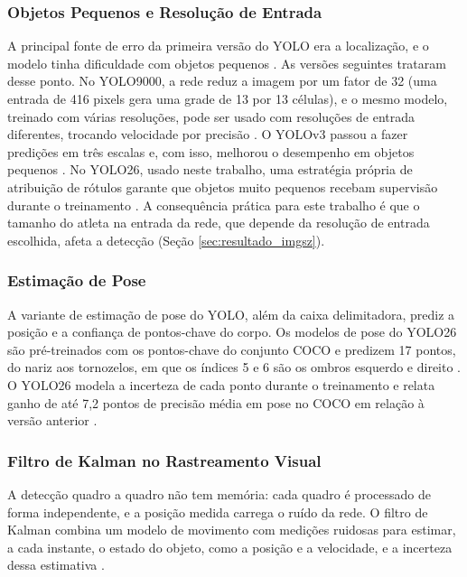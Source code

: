 \documentclass[
    12pt,               %
    openright,          %
    twoside,            %
    a4paper,            %
    chapter=TITLE,      %
    english,            %
    brazil              %
    ]{abntex2}
\begin{document}
\subsubsection{Objetos Pequenos e Resolução de Entrada}
A principal fonte de erro da primeira versão do YOLO era a localização, e o modelo tinha dificuldade com objetos pequenos \cite{redmon2016you}. As versões seguintes trataram desse ponto. No YOLO9000, a rede reduz a imagem por um fator de 32 (uma entrada de 416 pixels gera uma grade de 13 por 13 células), e o mesmo modelo, treinado com várias resoluções, pode ser usado com resoluções de entrada diferentes, trocando velocidade por precisão \cite{redmon2017yolo9000}. O YOLOv3 passou a fazer predições em três escalas e, com isso, melhorou o desempenho em objetos pequenos \cite{redmon2018yolov3}. No YOLO26, usado neste trabalho, uma estratégia própria de atribuição de rótulos garante que objetos muito pequenos recebam supervisão durante o treinamento \cite{jocher2026yolo26}. A consequência prática para este trabalho é que o tamanho do atleta na entrada da rede, que depende da resolução de entrada escolhida, afeta a detecção (Seção \ref{sec:resultado_imgsz}).

\subsubsection{Estimação de Pose}
A variante de estimação de pose do YOLO, além da caixa delimitadora, prediz a posição e a confiança de pontos-chave do corpo. Os modelos de pose do YOLO26 são pré-treinados com os pontos-chave do conjunto COCO e predizem 17 pontos, do nariz aos tornozelos, em que os índices 5 e 6 são os ombros esquerdo e direito \cite{ultralytics2026pose}. O YOLO26 modela a incerteza de cada ponto durante o treinamento e relata ganho de até 7,2 pontos de precisão média em pose no COCO em relação à versão anterior \cite{jocher2026yolo26}.

\subsubsection{Filtro de Kalman no Rastreamento Visual}
A detecção quadro a quadro não tem memória: cada quadro é processado de forma independente, e a posição medida carrega o ruído da rede. O filtro de Kalman \cite{kalman1960new} combina um modelo de movimento com medições ruidosas para estimar, a cada instante, o estado do objeto, como a posição e a velocidade, e a incerteza dessa estimativa \cite{sarkka2023bayesian}.
\end{document}
